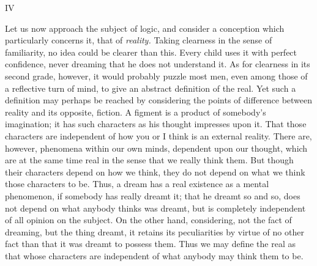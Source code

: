 \documentclass[]{article}
\newcommand*{\itemsection}[1]{\bigskip\centerline{#1}\nopagebreak}
\begin{document}
\itemsection{IV}



Let us now approach the subject of logic, and consider a conception which particularly concerns it, that of \emph{reality.} Taking clearness in the sense of familiarity, no idea could be clearer than this. Every child uses it with perfect confidence, never dreaming that he does not understand it. As for clearness in its second grade, however, it would probably puzzle most men, even among those of a reflective turn of mind, to give an abstract definition of the real. Yet such a definition may perhaps be reached by considering the points of difference between reality and its opposite, fiction. A figment is a product of somebody's imagination; it has such characters as his thought impresses upon it. That those characters are independent of how you or I think is an external reality. There are, however, phenomena within our own minds, dependent upon our thought, which are at the same time real in the sense that we really think them. But though their characters depend on how we think, they do not depend on what we think those characters to be. Thus, a dream has a real existence as a mental phenomenon, if somebody has really dreamt it; that he dreamt so and so, does not depend on what anybody thinks was dreamt, but is completely independent of all opinion on the subject. On the other hand, considering, not the fact of dreaming, but the thing dreamt, it retains its peculiarities by virtue of no other fact than that it was dreamt to possess them. Thus we may define the real as that whose characters are independent of what anybody may think them to be. 
 
\end{document}
